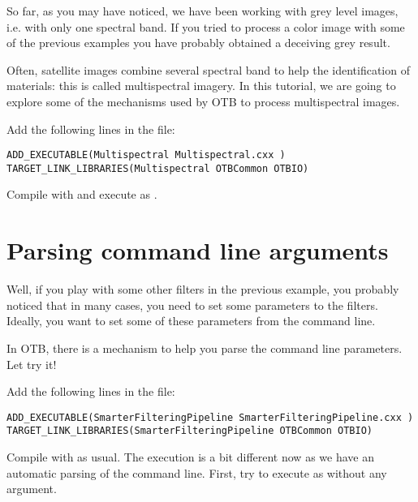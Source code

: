 So far, as you may have noticed, we have been working with grey level images,
i.e. with only one spectral band. If you tried to process a color image with
some of the previous examples you have probably obtained a deceiving grey
result.

Often, satellite images combine several spectral band to help the
identification of materials: this is called multispectral imagery. In this
tutorial, we are going to explore some of the mechanisms used by OTB to
process multispectral images.

Add the following lines in the  file:

\begin{small}
\begin{verbatim}
ADD_EXECUTABLE(Multispectral Multispectral.cxx )
TARGET_LINK_LIBRARIES(Multispectral OTBCommon OTBIO)
\end{verbatim}
\end{small}



Compile with  and execute as .

\section{Parsing command line arguments}
\label{sec:TutorialParsing}

Well, if you play with some other filters in the previous example, you probably
noticed that in many cases, you need to set some parameters to the filters.
Ideally, you want to set some of these parameters from the command line.

In OTB, there is a mechanism to help you parse the command line parameters. Let
try it!

Add the following lines in the  file:

\begin{small}
\begin{verbatim}
ADD_EXECUTABLE(SmarterFilteringPipeline SmarterFilteringPipeline.cxx )
TARGET_LINK_LIBRARIES(SmarterFilteringPipeline OTBCommon OTBIO)
\end{verbatim}
\end{small}



Compile with  as usual. The execution is a bit different now as we
have an automatic parsing of the command line. First, try to execute as
 without any argument.


